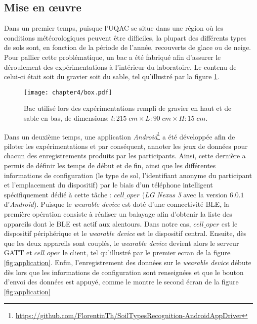 \subsection{Mise en \oe{}uvre}

Dans un premier temps, puisque l'\acs{UQAC} se situe dans une région où les conditions météorologiques peuvent être difficiles, la plupart des différents types de sols sont, en fonction de la période de l'année, recouverts de glace ou de neige. Pour pallier cette problématique, un bac a été fabriqué afin d'assurer le déroulement des expérimentations à l'intérieur du laboratoire. Le contenu de celui-ci était soit du gravier soit du sable, tel qu'illustré par la figure \ref{fig:box}.

\begin{figure}[t]
	\centering
	\texttt{[image: chapter4/box.pdf]}
        \caption{Bac utilisé lors des expérimentations rempli de gravier en haut et de sable en bas, de dimensions: $l : 215\; cm \times L : 90\; cm \times H : 15\; cm$.}
	\label{fig:box}
\end{figure}

Dans un deuxième temps, une application \textit{Android}\footnote{\url{https://github.com/FlorentinTh/SoilTypesRecognition-AndroidAppDriver}} a été développée afin de piloter les expérimentations et par conséquent, annoter les jeux de données pour chacun des enregistrements produits par les participants. Ainsi, cette dernière a permis de définir les temps de début et de fin, ainsi que les différentes informations de configuration (le type de sol, l'identifiant anonyme du participant et l'emplacement du dispositif) par le biais d'un téléphone intelligent spécifiquement dédié à cette tâche : $cell\_oper$ (\textit{LG Nexus 5} avec la version $6.0.1$ d'\textit{Android}). Puisque le \textit{wearable device} est doté d'une connectivité \acs{BLE}, la première opération consiste à réaliser un balayage afin d'obtenir la liste des appareils dont le \acs{BLE} est actif aux alentours. Dans notre cas, $cell\_oper$ est le dispositif périphérique et le \textit{wearable device} est le dispositif central. Ensuite, dès que les deux appareils sont couplés, le \textit{wearable device} devient alors le serveur \acs{GATT} et $cell\_oper$ le client, tel qu'illustré par le premier ecran de la figure \ref{fig:application}. Enfin, l'enregistrement des données sur le \textit{wearable device} débute dès lors que les informations de configuration sont renseignées et que le bouton d'envoi des données est appuyé, comme le montre le second écran de la figure \ref{fig:application}

